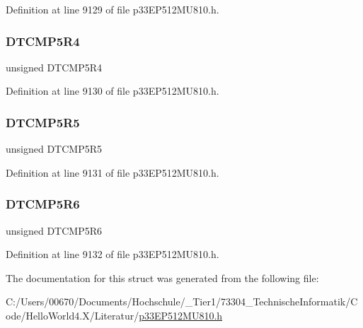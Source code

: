 Definition at line 9129 of file p33\+E\+P512\+M\+U810.\+h.

\mbox{\label{structtag_r_p_i_n_r40_b_i_t_s_ab7ee028c6bb9b48e10507e4673f5f2c7}} 
\subsubsection{\texorpdfstring{D\+T\+C\+M\+P5\+R4}{DTCMP5R4}}
{\footnotesize\ttfamily unsigned D\+T\+C\+M\+P5\+R4}



Definition at line 9130 of file p33\+E\+P512\+M\+U810.\+h.

\mbox{\label{structtag_r_p_i_n_r40_b_i_t_s_ad9e9c10db04c5ff7ac3a7f0663029b62}} 
\subsubsection{\texorpdfstring{D\+T\+C\+M\+P5\+R5}{DTCMP5R5}}
{\footnotesize\ttfamily unsigned D\+T\+C\+M\+P5\+R5}



Definition at line 9131 of file p33\+E\+P512\+M\+U810.\+h.

\mbox{\label{structtag_r_p_i_n_r40_b_i_t_s_a6cae0af6fa363377764e896e4ff5c858}} 
\subsubsection{\texorpdfstring{D\+T\+C\+M\+P5\+R6}{DTCMP5R6}}
{\footnotesize\ttfamily unsigned D\+T\+C\+M\+P5\+R6}



Definition at line 9132 of file p33\+E\+P512\+M\+U810.\+h.



The documentation for this struct was generated from the following file\+:\begin{DoxyCompactItemize}
\item 
C\+:/\+Users/00670/\+Documents/\+Hochschule/\+\_\+\+Tier1/73304\+\_\+\+Technische\+Informatik/\+Code/\+Hello\+World4.\+X/\+Literatur/\hyperlink{p33_e_p512_m_u810_8h}{p33\+E\+P512\+M\+U810.\+h}\end{DoxyCompactItemize}
